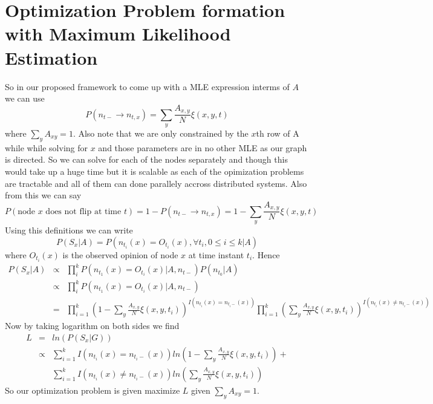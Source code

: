 \section*{Optimization Problem formation with Maximum Likelihood Estimation}
So in our proposed framework to come up with a MLE expression interms of $A$ we can use 
\begin{equation}
P(n_{t-} \rightarrow n_{t,x}) = \displaystyle\sum_{y} \frac{A_{x,y}}{N} \xi (x,y,t)
\end{equation}
where $\displaystyle\sum_{y} A_{xy}= 1$. Also note that we are only constrained by the $x$th row of A while while solving for $x$ and those parameters are in no other MLE as our graph is directed. So we can solve for each of the nodes separately and though this would take up a huge time but it is scalable as each of the opimization problems are tractable and all of them can done parallely accross distributed systems. Also from this we can say 
\begin{equation}
P(\mbox{node } x \mbox{ does not flip at time } t) = 1 - P(n_{t-} \rightarrow n_{t,x}) = 1 - \displaystyle\sum_{y} \frac{A_{x,y}}{N} \xi (x,y,t)
\end{equation}
 Using this definitions we can write 
\begin{equation}
P(S_x|A) = P(n_{t_{i}}(x) = O_{t_{i}}(x),\forall t_i, 0 \leq i \leq k|A)
\end{equation}
where $O_{t_{i}}(x)$ is the observed opinion of node $x$ at time instant $t_i$. Hence
\begin{eqnarray}
P(S_x|A) &\propto & \displaystyle\prod_{i}^{k} P(n_{t_1}(x) = O_{t_i}(x)|A,n_{t-})P(n_{t_0}|A) \nonumber \\
		 &\propto & \displaystyle\prod_{i}^{k} P(n_{t_1}(x) = O_{t_i}(x)|A,n_{t-}) \nonumber \\
		 &=& \displaystyle\prod_{i=1}^{k}(1 - \displaystyle\sum_{y} \frac{A_{x,y}}{N} \xi (x,y,t_i))^{I(n_{t_i}(x) = n_{t_i -}(x))}\displaystyle\prod_{i=1}^{k}(\displaystyle\sum_{y} \frac{A_{x,y}}{N} \xi (x,y,t_i))^{I(n_{t_i}(x) \neq n_{t_i -}(x))} \nonumber	
\end{eqnarray}
Now by taking logarithm on both sides we find
\begin{eqnarray*}
L &=& ln(P(S_{x}|G)) \\
 &\propto & \displaystyle\sum_{i=1}^{k}I(n_{t_i}(x) = n_{t_i -}(x))ln(1 - \displaystyle\sum_{y} \frac{A_{x,y}}{N} \xi (x,y,t_i)) + \\
  && {} \displaystyle\sum_{i=1}^{k}I(n_{t_i}(x) \neq n_{t_i -}(x))ln(\displaystyle\sum_{y} \frac{A_{x,y}}{N} \xi (x,y,t_i))
\end{eqnarray*}
So our optimization problem is given maximize $L$ given $\displaystyle\sum_{y} A_{xy}= 1$.
